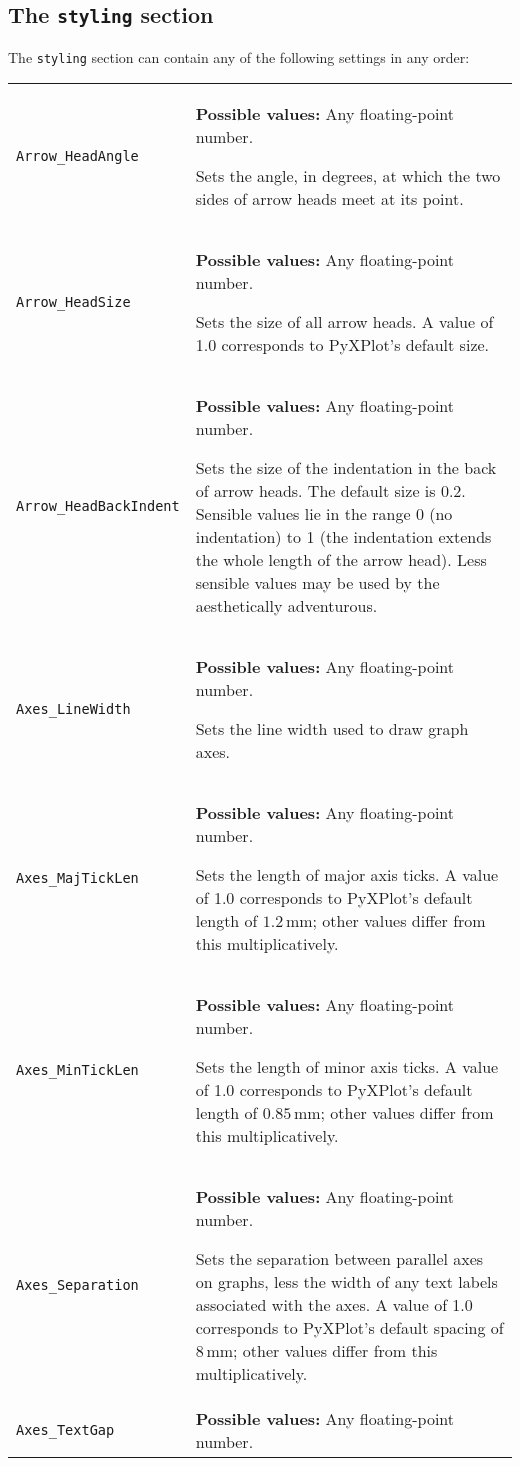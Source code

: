 \subsection{The {\tt styling} section}

The {\tt styling} section can contain any of the following settings in any order:

\begin{longtable}{p{3.4cm}p{9cm}}
{\tt Arrow\_HeadAngle} & {\bf Possible values:} Any floating-point number.

               Sets the angle, in degrees, at which the two sides of arrow heads meet at its point.
               \\
{\tt Arrow\_HeadSize} & {\bf Possible values:} Any floating-point number.

               Sets the size of all arrow heads. A value of 1.0 corresponds to PyXPlot's default size.
               \\
{\tt Arrow\_HeadBackIndent} & {\bf Possible values:} Any floating-point number.

               Sets the size of the indentation in the back of arrow heads. The default size is 0.2. Sensible values lie in the range 0 (no indentation) to 1 (the indentation extends the whole length of the arrow head). Less sensible values may be used by the aesthetically adventurous.
               \\
{\tt Axes\_LineWidth}  & {\bf Possible values:} Any floating-point number.

               Sets the line width used to draw graph axes.
               \\
{\tt Axes\_MajTickLen} & {\bf Possible values:} Any floating-point number.

               Sets the length of major axis ticks. A value of 1.0 corresponds to PyXPlot's default length of $1.2\,\mathrm{mm}$; other values differ from this multiplicatively.
               \\
{\tt Axes\_MinTickLen} & {\bf Possible values:} Any floating-point number.

               Sets the length of minor axis ticks. A value of 1.0 corresponds to PyXPlot's default length of $0.85\,\mathrm{mm}$; other values differ from this multiplicatively.
               \\
{\tt Axes\_Separation} & {\bf Possible values:} Any floating-point number.

               Sets the separation between parallel axes on graphs, less the width of any text labels associated with the axes. A value of 1.0 corresponds to PyXPlot's default spacing of $8\,\mathrm{mm}$; other values differ from this multiplicatively.
               \\
{\tt Axes\_TextGap} & {\bf Possible values:} Any floating-point number.


\end{longtable}
